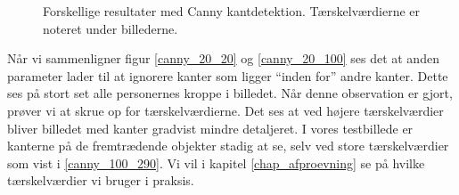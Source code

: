 {\begin{figure}[!h]
    \caption[]{Forskellige resultater med Canny kantdetektion.
    Tærskelværdierne er noteret under billederne.}
    \label{canny_kanter}
\end{figure}

Når vi sammenligner figur \ref{canny_20_20} og \ref{canny_20_100} ses
det at anden parameter lader til at ignorere kanter som ligger
``inden for'' andre kanter. Dette ses på stort set alle personernes
kroppe i billedet. Når denne observation er gjort, prøver vi at skrue op
for tærskelværdierne. Det ses at ved højere tærskelværdier bliver
billedet med kanter gradvist mindre detaljeret. I vores testbillede er
kanterne på de fremtrædende objekter stadig at se, selv ved store
tærskelværdier som vist i \ref{canny_100_290}. Vi vil i kapitel \ref{chap_afproevning} se på hvilke
tærskelværdier vi bruger i praksis.
}

